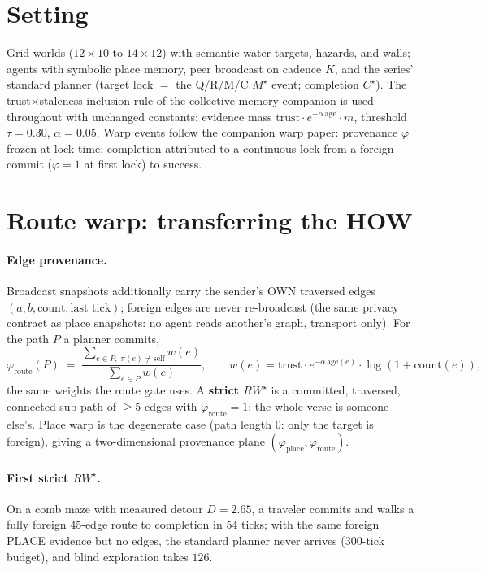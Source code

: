 \documentclass{article}
\newcommand{\rwstar}{RW^{\star}}
\newcommand{\mstar}{M^{\star}}
\newcommand{\cstar}{C^{\star}}
\newcommand{\phiroute}{\varphi_{\mathrm{route}}}
\begin{document}
\section{Setting}
\label{p3:sec:setting}

Grid worlds ($12{\times}10$ to $14{\times}12$) with semantic water
targets, hazards, and walls; agents with symbolic place memory,
peer broadcast on cadence $K$, and the series' standard planner
(target lock $=$ the Q/R/M/C $\mstar$ event; completion $\cstar$).
The trust$\times$staleness inclusion rule of the collective-memory
companion is used throughout with unchanged constants: evidence
mass $\text{trust}\cdot e^{-\alpha\,\text{age}}\cdot m$, threshold
$\tau{=}0.30$, $\alpha{=}0.05$. Warp events follow the companion warp
paper: provenance $\varphi$ frozen at lock time; completion attributed
to a continuous lock from a foreign commit ($\varphi{=}1$ at first
lock) to success. %

\section{Route warp: transferring the HOW}
\label{p3:sec:route}

\paragraph{Edge provenance.} Broadcast snapshots additionally carry the
sender's OWN traversed edges $(a,b,\text{count},\text{last tick})$;
foreign edges are never re-broadcast (the same privacy contract as
place snapshots: no agent reads another's graph, transport only). For
the path $P$ a planner commits,
\[
\phiroute(P) \;=\;
\frac{\sum_{e\in P,\;\pi(e)\neq\mathrm{self}} w(e)}
     {\sum_{e\in P} w(e)},
\qquad w(e) = \text{trust}\cdot e^{-\alpha\,\text{age}(e)}\cdot
\log(1{+}\text{count}(e)),
\]
the same weights the route gate uses. A \textbf{strict $\rwstar$} is a
committed, traversed, connected sub-path of $\ge 5$ edges with
$\phiroute = 1$: the whole verse is someone else's. Place warp is the
degenerate case (path length $0$: only the target is foreign), giving
a two-dimensional provenance plane $(\varphi_{\mathrm{place}},
\phiroute)$.

\paragraph{First strict $\rwstar$.} On a comb maze with measured
detour $D{=}2.65$, a traveler commits and walks a fully foreign
$45$-edge route to completion in $54$ ticks; with the same foreign
PLACE evidence but no edges, the standard planner never arrives
(300-tick budget), and blind exploration takes $126$.
\end{document}
